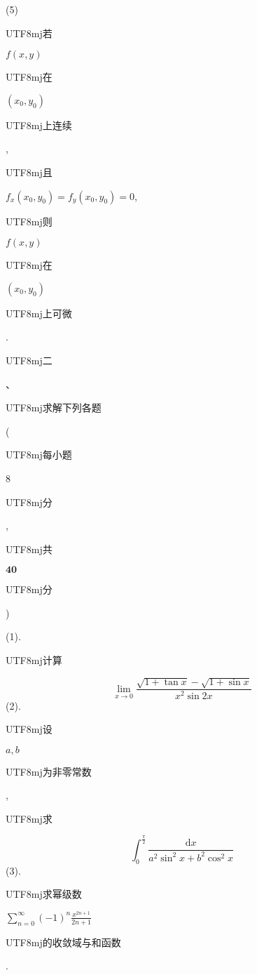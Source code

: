 \documentclass[10pt]{article}
\begin{document}
(5) \begin{CJK}{UTF8}{mj}若\end{CJK} $f(x, y)$ \begin{CJK}{UTF8}{mj}在\end{CJK} $\left(x_{0}, y_{0}\right)$ \begin{CJK}{UTF8}{mj}上连续\end{CJK}, \begin{CJK}{UTF8}{mj}且\end{CJK} $f_{x}\left(x_{0}, y_{0}\right)=f_{y}\left(x_{0}, y_{0}\right)=0$, \begin{CJK}{UTF8}{mj}则\end{CJK} $f(x, y)$ \begin{CJK}{UTF8}{mj}在\end{CJK} $\left(x_{0}, y_{0}\right)$ \begin{CJK}{UTF8}{mj}上可微\end{CJK}.

\begin{CJK}{UTF8}{mj}二\end{CJK}、\begin{CJK}{UTF8}{mj}求解下列各题\end{CJK} (\begin{CJK}{UTF8}{mj}每小题\end{CJK} 8 \begin{CJK}{UTF8}{mj}分\end{CJK}, \begin{CJK}{UTF8}{mj}共\end{CJK} $\mathbf{4 0}$ \begin{CJK}{UTF8}{mj}分\end{CJK})

(1). \begin{CJK}{UTF8}{mj}计算\end{CJK}
$$
\lim _{x \rightarrow 0} \frac{\sqrt{1+\tan x}-\sqrt{1+\sin x}}{x^{2} \sin 2 x}
$$
(2). \begin{CJK}{UTF8}{mj}设\end{CJK} $a, b$ \begin{CJK}{UTF8}{mj}为非零常数\end{CJK}, \begin{CJK}{UTF8}{mj}求\end{CJK}
$$
\int_{0}^{\frac{\pi}{2}} \frac{\mathrm{d} x}{a^{2} \sin ^{2} x+b^{2} \cos ^{2} x}
$$
(3). \begin{CJK}{UTF8}{mj}求幂级数\end{CJK} $\sum_{n=0}^{\infty}(-1)^{n} \frac{x^{2 n+1}}{2 n+1}$ \begin{CJK}{UTF8}{mj}的收敛域与和函数\end{CJK}.
\end{document}
